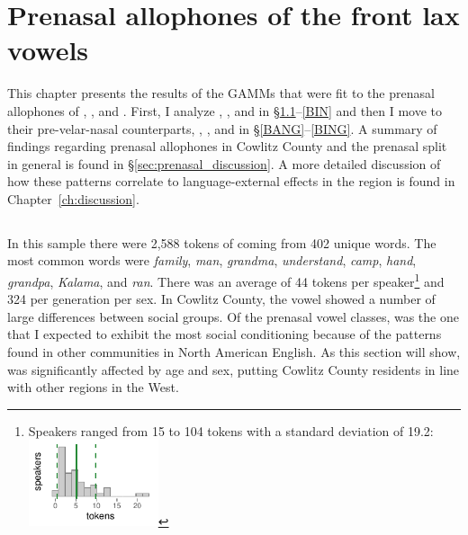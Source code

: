 \chapter{Prenasal allophones of the front lax vowels}
\label{ch:prenasal}



This chapter presents the results of the GAMMs that were fit to the prenasal allophones of \trap, \dress, and \kit. First, I analyze \ban, \ben, and \bin in \S\ref{BAN}--\ref{BIN} and then I move to their pre-velar-nasal counterparts, \bang, \beng, and \bing in \S\ref{BANG}--\ref{BING}. A summary of findings regarding prenasal allophones in Cowlitz County and the prenasal split in general is found in \S\ref{sec:prenasal_discussion}. A more detailed discussion of how these patterns correlate to language-external effects in the region is found in Chapter~\ref{ch:discussion}.

\section{\ban}
\label{BAN}

In this sample there were 2,588 tokens of \ban coming from 402 unique words. The most common words were \textit{family}, \textit{man}, \textit{grandma}, \textit{understand}, \textit{camp}, \textit{hand}, \textit{grandpa}, \textit{Kalama}, and \textit{ran}. There was an average of 44 tokens per speaker\footnote{Speakers ranged from 15 to 104 tokens with a standard deviation of 19.2: \includegraphics[width = 1.5in]{Figures/BANG/BANG_tiny.pdf}} and 324 per generation per sex. In Cowlitz County, the \ban vowel showed a number of large differences between social groups. Of the prenasal vowel classes, \ban was the one that I expected to exhibit the most social conditioning because of the patterns found in other communities in North American English. As this section will show, \ban was significantly affected by age and sex, putting Cowlitz County residents in line with other regions in the West.

